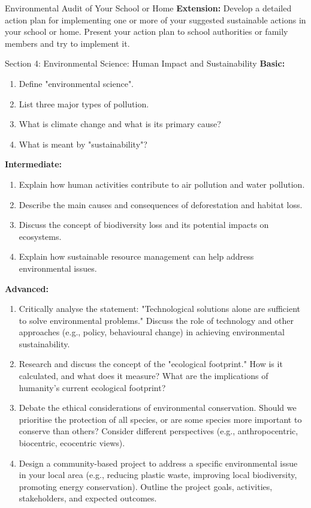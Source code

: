 \begin{investigation}{Environmental Audit of Your School or Home}
\textbf{Extension:}  Develop a detailed action plan for implementing one or more of your suggested sustainable actions in your school or home.  Present your action plan to school authorities or family members and try to implement it.
\end{investigation}


\begin{tieredquestions}{Section 4: Environmental Science: Human Impact and Sustainability}
\textbf{Basic:}
\begin{enumerate}
    \item Define "environmental science".
    \item List three major types of pollution.
    \item What is climate change and what is its primary cause?
    \item What is meant by "sustainability"?
\end{enumerate}

\textbf{Intermediate:}
\begin{enumerate}
    \item Explain how human activities contribute to air pollution and water pollution.
    \item Describe the main causes and consequences of deforestation and habitat loss.
    \item Discuss the concept of biodiversity loss and its potential impacts on ecosystems.
    \item Explain how sustainable resource management can help address environmental issues.
\end{enumerate}

\textbf{Advanced:}
\begin{enumerate}
    \item  Critically analyse the statement: "Technological solutions alone are sufficient to solve environmental problems."  Discuss the role of technology and other approaches (e.g., policy, behavioural change) in achieving environmental sustainability.
    \item  Research and discuss the concept of the "ecological footprint." How is it calculated, and what does it measure? What are the implications of humanity's current ecological footprint?
    \item  Debate the ethical considerations of environmental conservation.  Should we prioritise the protection of all species, or are some species more important to conserve than others?  Consider different perspectives (e.g., anthropocentric, biocentric, ecocentric views).
    \item  Design a community-based project to address a specific environmental issue in your local area (e.g., reducing plastic waste, improving local biodiversity, promoting energy conservation).  Outline the project goals, activities, stakeholders, and expected outcomes.
\end{enumerate}
\end{tieredquestions}


